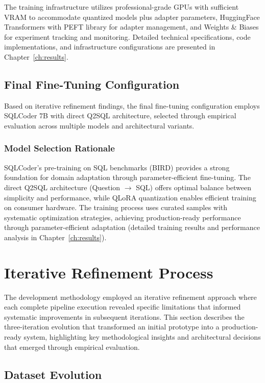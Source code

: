 The training infrastructure utilizes professional-grade GPUs with sufficient VRAM to accommodate quantized models plus adapter parameters, HuggingFace Transformers with PEFT library for adapter management, and Weights \& Biases for experiment tracking and monitoring. Detailed technical specifications, code implementations, and infrastructure configurations are presented in Chapter~\ref{ch:results}.

\subsection{Final Fine-Tuning Configuration}

Based on iterative refinement findings, the final fine-tuning configuration employs SQLCoder 7B with direct Q2SQL architecture, selected through empirical evaluation across multiple models and architectural variants.

\subsubsection{Model Selection Rationale}

SQLCoder's pre-training on SQL benchmarks (BIRD) provides a strong foundation for domain adaptation through parameter-efficient fine-tuning. The direct Q2SQL architecture (Question $\rightarrow$ SQL) offers optimal balance between simplicity and performance, while QLoRA quantization enables efficient training on consumer hardware. The training process uses curated samples with systematic optimization strategies, achieving production-ready performance through parameter-efficient adaptation (detailed training results and performance analysis in Chapter~\ref{ch:results}).

\section{Iterative Refinement Process}

The development methodology employed an iterative refinement approach where each complete pipeline execution revealed specific limitations that informed systematic improvements in subsequent iterations. This section describes the three-iteration evolution that transformed an initial prototype into a production-ready system, highlighting key methodological insights and architectural decisions that emerged through empirical evaluation.

\subsection{Dataset Evolution}

